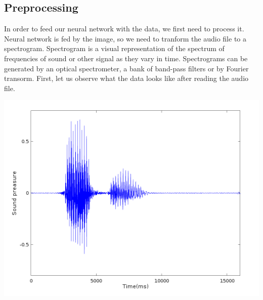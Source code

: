 \documentclass[twoside]{article}
\newenvironment{Figure}
  {\par\medskip\noindent\minipage{\linewidth}}
  {\endminipage\par\medskip}
\begin{document}
\begin{multicols}{2}
\subsection{Preprocessing}
In order to feed our neural network with the data, we first need to process it. Neural network is fed by the image, so we need to tranform the audio file to a spectrogram. Spectrogram is a visual representation of the spectrum of frequencies of sound or other signal as they vary in time. Spectrograms can be generated by an optical spectrometer, a bank of band-pass filters or by Fourier transorm. 
First, let us observe what the data looks like after reading the audio file. \\
 
\begin{Figure}
	\centering
	\includegraphics[width=1.0\textwidth]{happy-read1}
	\label{img:pocetnoStanje}
\end{Figure}


\end{multicols}
\end{document}

